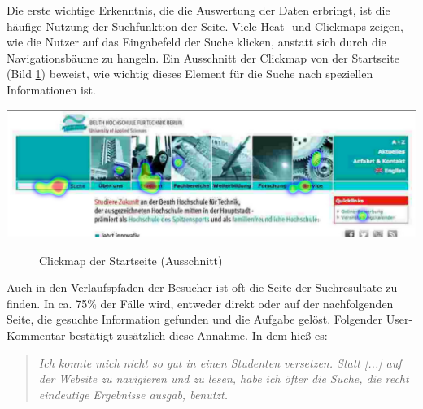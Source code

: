 Die erste wichtige Erkenntnis, die die Auswertung der Daten erbringt, ist die häufige Nutzung der Suchfunktion der Seite. Viele Heat- und Clickmaps zeigen, wie die Nutzer auf das Eingabefeld der Suche klicken, anstatt sich durch die Navigationsbäume zu hangeln. Ein Ausschnitt der Clickmap von der Startseite (Bild \ref{clickmapSearch}) beweist, wie wichtig dieses Element für die Suche nach speziellen Informationen ist.
\\
\begin{center}
\includegraphics[scale=0.52]{./images/clickmap-search}
\end{center}
\begin{figure}[htb]
   \centering
   \caption{Clickmap der Startseite (Ausschnitt)}
    \label{clickmapSearch}
\end{figure}

Auch in den Verlaufspfaden der Besucher ist oft die Seite der Suchresultate zu finden. In ca. 75\% der Fälle wird, entweder direkt oder auf der nachfolgenden Seite, die gesuchte Information gefunden und die Aufgabe gelöst. Folgender User-Kommentar bestätigt zusätzlich diese Annahme. In dem hieß es:

\begin{quote}
     \glqq \textit{Ich konnte mich nicht so gut in einen Studenten versetzen. Statt [...] auf der Website zu navigieren und zu lesen, habe ich öfter die Suche, die recht eindeutige Ergebnisse ausgab, benutzt.}\grqq{}
\end{quote}

